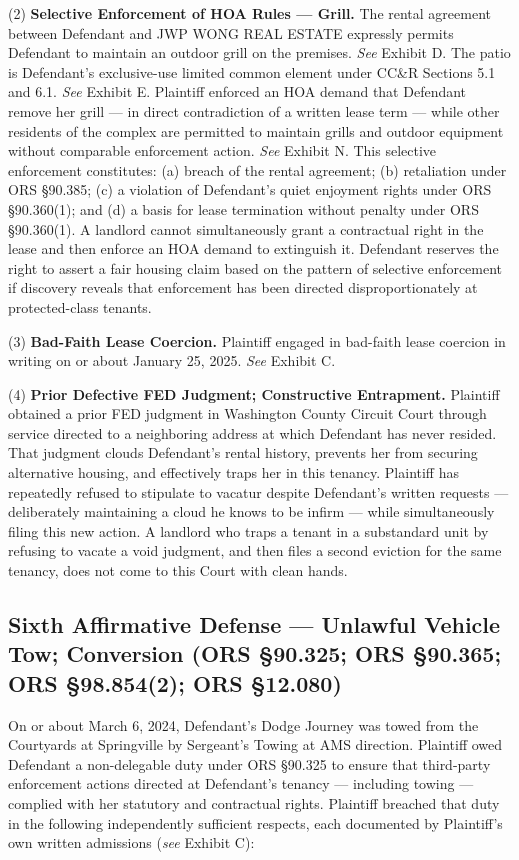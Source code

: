 \documentclass[12pt,letterpaper]{article}
\begin{document}
	(2) \textbf{Selective Enforcement of HOA Rules --- Grill.} The rental agreement between Defendant and JWP WONG REAL ESTATE expressly permits Defendant to maintain an outdoor grill on the premises. \textit{See} Exhibit D. The patio is Defendant's exclusive-use limited common element under CC\&R Sections 5.1 and 6.1. \textit{See} Exhibit E. Plaintiff enforced an HOA demand that Defendant remove her grill --- in direct contradiction of a written lease term --- while other residents of the complex are permitted to maintain grills and outdoor equipment without comparable enforcement action. \textit{See} Exhibit N. This selective enforcement constitutes: (a) breach of the rental agreement; (b) retaliation under ORS \S90.385; (c) a violation of Defendant's quiet enjoyment rights under ORS \S90.360(1); and (d) a basis for lease termination without penalty under ORS \S90.360(1). A landlord cannot simultaneously grant a contractual right in the lease and then enforce an HOA demand to extinguish it. Defendant reserves the right to assert a fair housing claim based on the pattern of selective enforcement if discovery reveals that enforcement has been directed disproportionately at protected-class tenants.
	
	(3) \textbf{Bad-Faith Lease Coercion.} Plaintiff engaged in bad-faith lease coercion in writing on or about January 25, 2025. \textit{See} Exhibit C.
	
	(4) \textbf{Prior Defective FED Judgment; Constructive Entrapment.} Plaintiff obtained a prior FED judgment in Washington County Circuit Court through service directed to a neighboring address at which Defendant has never resided. That judgment clouds Defendant's rental history, prevents her from securing alternative housing, and effectively traps her in this tenancy. Plaintiff has repeatedly refused to stipulate to vacatur despite Defendant's written requests --- deliberately maintaining a cloud he knows to be infirm --- while simultaneously filing this new action. A landlord who traps a tenant in a substandard unit by refusing to vacate a void judgment, and then files a second eviction for the same tenancy, does not come to this Court with clean hands.
	
	\subsection{Sixth Affirmative Defense --- Unlawful Vehicle Tow; Conversion (ORS \S90.325; ORS \S90.365; ORS \S98.854(2); ORS \S12.080)}
	
	On or about March 6, 2024, Defendant's Dodge Journey was towed from the Courtyards at Springville by Sergeant's Towing at AMS direction. Plaintiff owed Defendant a non-delegable duty under ORS \S90.325 to ensure that third-party enforcement actions directed at Defendant's tenancy --- including towing --- complied with her statutory and contractual rights. Plaintiff breached that duty in the following independently sufficient respects, each documented by Plaintiff's own written admissions (\textit{see} Exhibit C):
	
\end{document}
